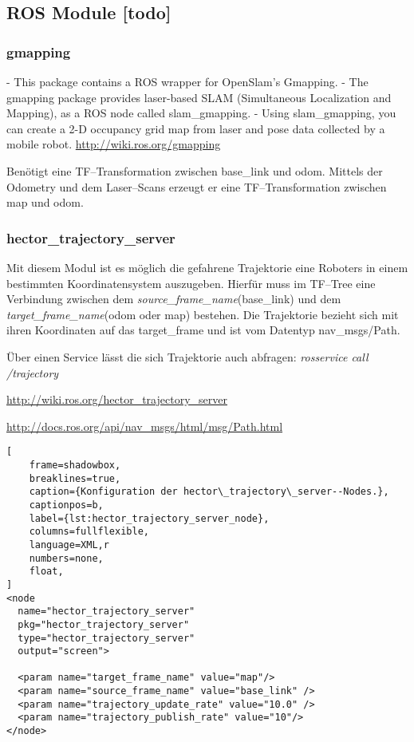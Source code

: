 \subsection{ROS Module [todo]}


\begin{comment}
------------------------------------------------------------------------------------------
\end{comment}
\subsubsection{gmapping}

- This package contains a ROS wrapper for OpenSlam's Gmapping.
- The gmapping package provides laser-based SLAM (Simultaneous Localization and Mapping), as a ROS node called slam_gmapping.
- Using slam_gmapping, you can create a 2-D occupancy grid map from laser and pose data collected by a mobile robot.
\url{http://wiki.ros.org/gmapping}

Benötigt eine TF--Transformation zwischen base\_link und odom. Mittels der Odometry und dem Laser--Scans erzeugt er eine TF--Transformation zwischen map und odom.


\begin{comment}
------------------------------------------------------------------------------------------
\end{comment}
\subsubsection{hector\_trajectory\_server}

Mit diesem Modul ist es möglich die gefahrene Trajektorie eine Roboters in einem bestimmten Koordinatensystem auszugeben. Hierfür muss im TF--Tree eine Verbindung zwischen dem \textit{source\_frame\_name}(base\_link) und dem \textit{target\_frame\_name}(odom oder map) bestehen. Die Trajektorie bezieht sich mit ihren Koordinaten auf das target\_frame und ist vom Datentyp nav\_msgs/Path.

Über einen Service lässt die sich Trajektorie auch abfragen: \textit{rosservice call /trajectory}

\url{http://wiki.ros.org/hector_trajectory_server}

\url{http://docs.ros.org/api/nav_msgs/html/msg/Path.html}

\begin{lstlisting}[
	frame=shadowbox,
	breaklines=true,
	caption={Konfiguration der hector\_trajectory\_server--Nodes.},
	captionpos=b,
	label={lst:hector_trajectory_server_node},
	columns=fullflexible,
	language=XML,r
	numbers=none,
	float,
]
<node 
  name="hector_trajectory_server"
  pkg="hector_trajectory_server"
  type="hector_trajectory_server"
  output="screen">

  <param name="target_frame_name" value="map"/>
  <param name="source_frame_name" value="base_link" />
  <param name="trajectory_update_rate" value="10.0" />
  <param name="trajectory_publish_rate" value="10"/>
</node>
\end{lstlisting}



